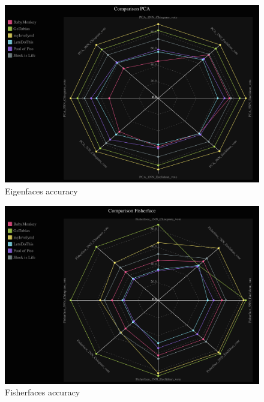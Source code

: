 \documentclass{report}
\begin{document}
\begin{figure}[!htb]
  \centering
  \includegraphics[scale=0.2]{images/PCA_radar.png}
  \caption{Eigenfaces accuracy}
  \label{fig:eigen-acc}
\end{figure}

\begin{figure}[!htb]
  \centering
  \includegraphics[scale=0.2]{images/Fisherface_radar.png}
  \caption{Fisherfaces accuracy}
  \label{fig:fish-acc}
\end{figure}
\end{document}
